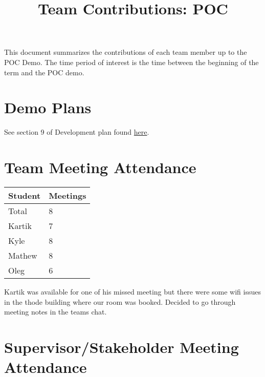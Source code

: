 \documentclass{article}
\title{Team Contributions: POC\\\progname}
\author{\authname}
\date{}
\begin{document}
\maketitle

This document summarizes the contributions of each team member up to the POC
Demo.  The time period of interest is the time between the beginning of the term
and the POC demo.

\section{Demo Plans}

See section 9 of Development plan found \href{https://github.com/OKKM-insights/OKKM.insights/blob/main/docs/DevelopmentPlan/DevelopmentPlan.pdf}{here}.


\section{Team Meeting Attendance}


\begin{table}[H]
\centering
\begin{tabular}{ll}
\toprule
\textbf{Student} & \textbf{Meetings}\\
\midrule
Total & 8\\
Kartik & 7\\
Kyle & 8\\
Mathew & 8\\
Oleg & 6\\
\bottomrule
\end{tabular}
\end{table}

Kartik was available for one of his missed meeting but there were some wifi issues in the thode building where our room was booked. Decided to go through meeting notes in the teams chat. \\

\section{Supervisor/Stakeholder Meeting Attendance}
\end{document}
